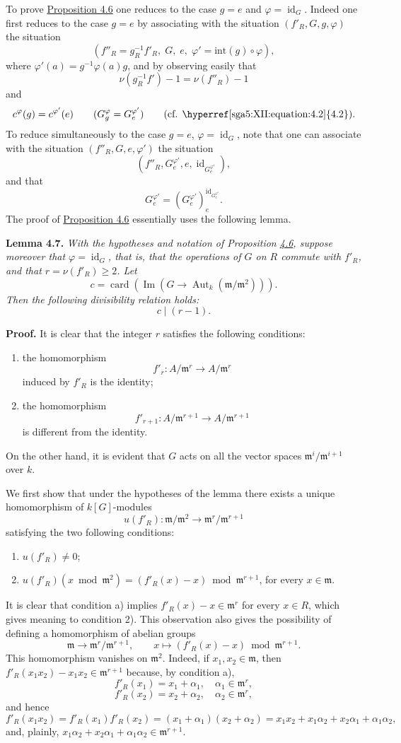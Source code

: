 \documentclass[11pt]{article}
\providecommand{\fm}{\mathfrak{m}}
\providecommand{\id}{\operatorname{id}}
\providecommand{\id}{\operatorname{id}}
\providecommand{\id}{\operatorname{id}}
\providecommand{\Aut}{\operatorname{Aut}}
\providecommand{\id}{\operatorname{id}}
\providecommand{\id}{\operatorname{id}}
\providecommand{\im}{\operatorname{Im}}
\providecommand{\fm}{\mathfrak m}
\providecommand{\card}{\operatorname{card}}
\providecommand{\im}{\operatorname{im}}
\providecommand{\Aut}{\operatorname{Aut}}
\providecommand{\id}{\operatorname{id}}
\begin{document}
\medskip
To prove \hyperref[sga5:XII:proposition:4.6]{Proposition 4.6} one reduces to the case $g=e$ and $\varphi=\id_G$. Indeed one first reduces to the case $g=e$ by associating with the situation $(f'_R,G,g,\varphi)$ the situation
\[
(f''_R=g_R^{-1}f'_R,
\; G,
\; e,
\; \varphi'=\mathrm{int}(g)\circ\varphi),
\]
where $\varphi'(a)=g^{-1}\varphi(a)g$, and by observing easily that
\[
\nu(g_R^{-1}f')-1=\nu(f''_R)-1
\]
and
\[
c^\varphi(g)=c^{\varphi'}(e)\qquad (G_g^\varphi=G_e^{\varphi'})\qquad (\text{cf. \hyperref[sga5:XII:equation:4.2]{4.2}}).
\]
To reduce simultaneously to the case $g=e$, $\varphi=\id_G$, note that one can associate with the situation $(f''_R,G,e,\varphi')$ the situation
\[
(f''_R,G_e^{\varphi'},e,\id_{G_e^{\varphi'}}),
\]
and that
\[
G_e^{\varphi'}=(G_e^{\varphi'})_e^{\id_{G_e^{\varphi'}}}.
\]
The proof of \hyperref[sga5:XII:proposition:4.6]{Proposition 4.6} essentially uses the following lemma.

\medskip
\noindent
{}\label{sga5:XII:lemma:4.7}\textbf{Lemma 4.7.} \emph{With the hypotheses and notation of Proposition \hyperref[sga5:XII:proposition:4.6]{4.6}, suppose moreover that $\varphi=\id_G$, that is, that the operations of $G$ on $R$ commute with $f'_R$, and that $r=\nu(f'_R)\ge2$. Let
\[
c=\card(\im(G\longrightarrow \Aut_k(\fm/\fm^2))).
\]
Then the following divisibility relation holds:
\[
c\mid (r-1).
\]}

\medskip
\noindent
\textbf{Proof.} It is clear that the integer $r$ satisfies the following conditions:
\begin{enumerate}
\item[a)] the homomorphism
\[
f'_r:A/\fm^r\longrightarrow A/\fm^r
\]
induced by $f'_R$ is the identity;
\item[b)] the homomorphism
\[
f'_{r+1}:A/\fm^{r+1}\longrightarrow A/\fm^{r+1}
\]
is different from the identity.
\end{enumerate}
On the other hand, it is evident that $G$ acts on all the vector spaces $\fm^i/\fm^{i+1}$ over $k$.

We first show that under the hypotheses of the lemma there exists a unique homomorphism of $k[G]$-modules
\[
u(f'_R):\fm/\fm^2\longrightarrow \fm^r/\fm^{r+1}
\]
satisfying the two following conditions:
\begin{enumerate}
\item[1)] $u(f'_R)\ne0$;
\item[2)] $u(f'_R)(x\bmod \fm^2)=(f'_R(x)-x)\bmod \fm^{r+1}$, for every $x\in\fm$.
\end{enumerate}
It is clear that condition a) implies $f'_R(x)-x\in\fm^r$ for every $x\in R$, which gives meaning to condition 2). This observation also gives the possibility of defining a homomorphism of abelian groups
\[
\fm\longrightarrow \fm^r/\fm^{r+1},
\qquad
x\longmapsto (f'_R(x)-x)\bmod \fm^{r+1}.
\]
This homomorphism vanishes on $\fm^2$. Indeed, if $x_1,x_2\in\fm$, then $f'_R(x_1x_2)-x_1x_2\in\fm^{r+1}$ because, by condition a),
\[
f'_R(x_1)=x_1+\alpha_1,
\quad \alpha_1\in\fm^r,
\]
\[
f'_R(x_2)=x_2+\alpha_2,
\quad \alpha_2\in\fm^r,
\]
and hence
\[
f'_R(x_1x_2)=f'_R(x_1)f'_R(x_2)=(x_1+\alpha_1)(x_2+\alpha_2)
=x_1x_2+x_1\alpha_2+x_2\alpha_1+\alpha_1\alpha_2,
\]
and, plainly, $x_1\alpha_2+x_2\alpha_1+\alpha_1\alpha_2\in\fm^{r+1}$.
\end{document}
